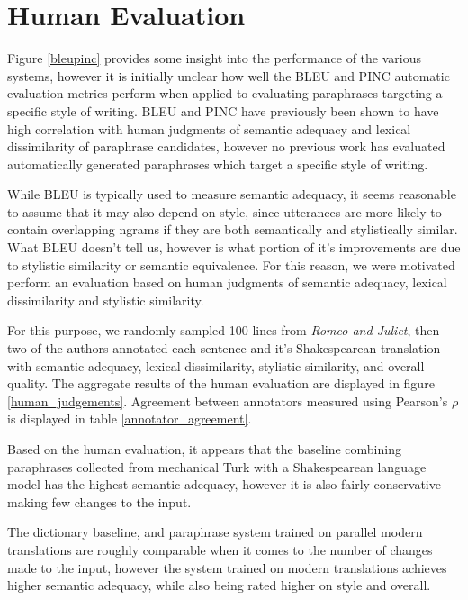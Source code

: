 \documentclass[10pt,a5paper,twoside]{article}
\begin{document}
\section{Human Evaluation}
\label{human_evaluation}
Figure \ref{bleupinc} provides some insight into the performance of the various systems, however it is initially unclear how well the BLEU and PINC
automatic evaluation metrics perform when applied to evaluating paraphrases targeting a specific style of writing.  BLEU and PINC have previously
been shown to have high correlation with human judgments of semantic adequacy and lexical dissimilarity of paraphrase candidates, however no
previous work has evaluated automatically generated paraphrases which target a specific style of writing.

While BLEU is typically used to measure semantic adequacy, it seems reasonable to assume that it may also depend on style, since utterances
are more likely to contain overlapping ngrams if they are both semantically and stylistically similar.  What BLEU doesn't tell us, however
is what portion of it's improvements are due to stylistic similarity or semantic equivalence.  For this reason, we were motivated perform
an evaluation based on human judgments of semantic adequacy, lexical dissimilarity and stylistic similarity.

For this purpose, we randomly sampled 100 lines from {\em Romeo and Juliet}, then two of the authors annotated each sentence and it's Shakespearean
translation with semantic adequacy, lexical dissimilarity, stylistic similarity, and overall quality.
The aggregate results of the human evaluation are displayed in figure \ref{human_judgements}.  Agreement between annotators
measured using Pearson's $\rho$ is displayed in table \ref{annotator_agreement}.

Based on the human evaluation, it appears that the baseline combining paraphrases collected from mechanical Turk \cite{chen11} with
a Shakespearean language model has the highest semantic adequacy, however it is also fairly conservative making few changes to the input.

The dictionary baseline, and paraphrase system trained on parallel modern translations are roughly comparable when it comes to 
the number of changes made to the input, however the system trained on modern translations achieves higher semantic adequacy, while also being rated higher on style and overall.
\end{document}

